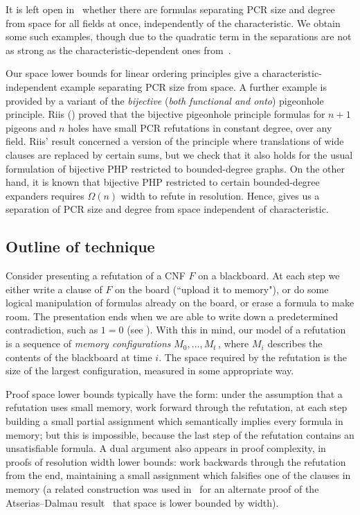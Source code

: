 \smallskip 
{}
It is left open in~\cite{DBLP:conf/icalp/FilmusLMNV13} whether there are formulas
separating PCR size and degree from space for all fields at once, independently of the characteristic. 
We obtain some such examples, though due to the quadratic term in 
the separations are not as strong as the characteristic-dependent ones from~\cite{DBLP:conf/icalp/FilmusLMNV13}.

Our space lower bounds for linear ordering principles give a characteristic-independent example separating PCR size from space.
A further example is provided by a variant of the \emph{bijective} (\emph{both functional and onto}) pigeonhole principle. 
Riis (\cite{riis,DBLP:conf/dlt/Razborov01}) proved that the bijective pigeonhole principle formulas for $n+1$ pigeons and $n$ holes 
have small PCR refutations in constant degree, over any field. Riis' result concerned a version of the principle 
where translations of wide clauses are replaced by certain sums, but we check that it also holds for the usual formulation
of bijective PHP restricted to bounded-degree graphs.
On the other hand, it is known that bijective PHP restricted to certain
bounded-degree expanders requires $\Omega(n)$ width to refute in resolution.  
Hence,  gives us a separation of PCR size and degree from space independent of characteristic.
 
\subsection{Outline of technique} 
\label{subsec:outline}

Consider presenting a refutation of a CNF $F$ on a blackboard.
At each step we either write a clause of $F$ on the board
(``upload it to memory"), or do some logical manipulation
of formulas already on the board, or erase a formula to 
make room. The presentation ends when we 
are able to write down a predetermined contradiction,
such as $1=0$ (see ).
With this in mind, our model of a refutation is a
sequence of \emph{memory configurations}
$M_0, \ldots, M_t$\,, where $M_i$ describes the contents
of the blackboard at time $i$. The space required
by the refutation is the size of the largest configuration,
measured in some appropriate way.

Proof space lower bounds  typically have the form:
under the assumption that a refutation uses small memory, 
 work forward through the refutation, 
at each step building a small partial assignment which semantically implies every formula in memory;
but this is impossible, because the last step of the refutation contains an unsatisfiable formula.  
A dual argument also appears in proof complexity, in proofs of resolution width lower bounds:
work backwards through the refutation from the end, 
maintaining a small assignment which falsifies one of the clauses 
in memory (a related construction was used in~\cite{DBLP:journals/tocl/FilmusLMNV15}
for an alternate proof of the Atserias--Dalmau
result~\cite{DBLP:journals/jcss/AtseriasD08} that space is lower bounded by width).

